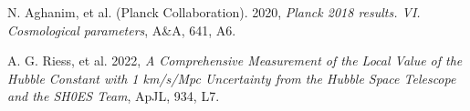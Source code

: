 \documentclass{BSpacePaper} %
\begin{document}

\begin{thebibliography}{9}

N. Aghanim, et al. (Planck Collaboration). 2020,
\textit{Planck 2018 results. VI. Cosmological parameters},
A\&A, 641, A6.

A. G. Riess, et al. 2022,
\textit{A Comprehensive Measurement of the Local Value of the Hubble Constant with 1 km/s/Mpc Uncertainty from the Hubble Space Telescope and the SH0ES Team},
ApJL, 934, L7.

\end{thebibliography}
\end{document}
